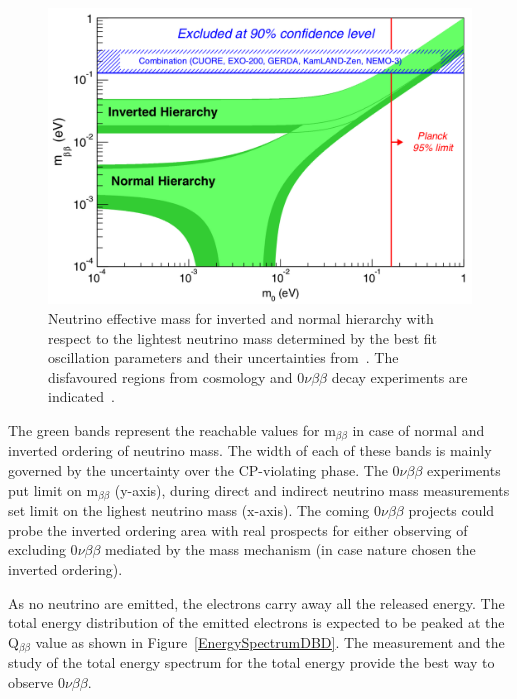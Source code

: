 \documentclass[main.tex]{subfiles}
\begin{document}
\begin{figure}[h!]
\begin{center}
\includegraphics[scale=0.35]{pictures/Chap2/m1NuMassContours2sigma_v4.png}
\caption{Neutrino effective mass for inverted and normal hierarchy with respect to the lightest neutrino mass determined by the best fit oscillation parameters and their uncertainties from~\cite{GlobalFitNeutrinoParameter}. The disfavoured regions from cosmology and 0$\nu\beta\beta$ decay experiments are indicated~\cite{MeffVsM0}.}
\label{EffectiveMassNMM}
\end{center}
\end{figure}


\NI The green bands represent the reachable values for m$_{\beta\beta}$ in case of normal and inverted ordering of neutrino mass. The width of each of these bands is mainly governed by the uncertainty over the CP-violating phase. The 0$\nu\beta\beta$ experiments put limit on m$_{\beta\beta}$ (y-axis), during direct and indirect neutrino mass measurements set limit on the lighest neutrino mass (x-axis). The coming 0$\nu\beta\beta$ projects could probe the inverted ordering area with real prospects for either observing of excluding 0$\nu\beta\beta$ mediated by the mass mechanism (in case nature chosen the inverted ordering).


\bigskip


\NI As no neutrino are emitted, the electrons carry away all the released energy. The total energy distribution of the emitted electrons is expected to be peaked at the Q$_{\beta\beta}$ value as shown in Figure~\ref{EnergySpectrumDBD}. The measurement and the study of the total energy spectrum for the total energy provide the best way to observe 0$\nu\beta\beta$.
\end{document}
